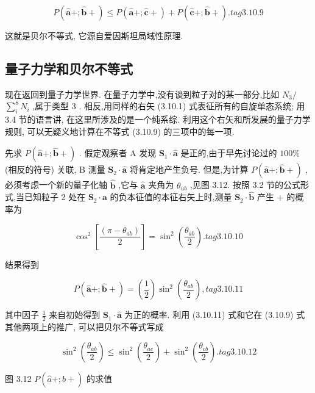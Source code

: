 $$
P\left( {\widehat{\mathbf{a}}+;\widehat{\mathbf{b}} + }\right) \leq P\left( {\widehat{\mathbf{a}}+;\widehat{\mathbf{c}} + }\right) + P\left( {\widehat{\mathbf{c}}+;\widehat{\mathbf{b}} + }\right) . tag{3.10.9}
$$

这就是贝尔不等式, 它源自爱因斯坦局域性原理.

\subsection{量子力学和贝尔不等式}

现在返回到量子力学世界. 在量子力学中,没有谈到粒子对的某一部分,比如 ${N}_{3}/$ $\mathop{\sum }\limits_{i}^{8}{N}_{i}$ ,属于类型 3 . 相反,用同样的右矢 (3.10.1) 式表征所有的自旋单态系统; 用 3.4 节的语言讲, 在这里所涉及的是一个纯系综. 利用这个右矢和所发展的量子力学规则, 可以无疑义地计算在不等式 (3.10.9) 的三项中的每一项.

先求 $P\left( {\widehat{\mathbf{a}}+;\widehat{\mathbf{b}} + }\right)$ . 假定观察者 $\mathrm{A}$ 发现 ${\mathbf{S}}_{1} \cdot \widehat{\mathbf{a}}$ 是正的,由于早先讨论过的 ${100}\%$ (相反的符号) 关联, $\mathrm{B}$ 测量 ${\mathbf{S}}_{2} \cdot \widehat{\mathbf{a}}$ 将肯定地产生负号. 但是,为计算 $P\left( {\widehat{\mathbf{a}}+;\widehat{\mathbf{b}} + }\right)$ ,必须考虑一个新的量子化轴 $\widehat{\mathbf{b}}$ ,它与 $\widehat{\mathbf{a}}$ 夹角为 ${\theta }_{ub}$ ,见图 3.12. 按照 3.2 节的公式形式,当已知粒子 2 处在 ${\mathbf{S}}_{2} \cdot \widehat{\mathbf{a}}$ 的负本征值的本征右矢上时,测量 ${\mathbf{S}}_{2} \cdot \widehat{\mathbf{b}}$ 产生 + 的概率为

$$
{\cos }^{2}\left\lbrack \frac{\left( \pi - {\theta }_{ab}\right) }{2}\right\rbrack = {\sin }^{2}\left( \frac{{\theta }_{ab}}{2}\right) . tag{3.10.10}
$$

结果得到

$$
P\left( {\widehat{\mathbf{a}}+;\widehat{\mathbf{b}} + }\right) = \left( \frac{1}{2}\right) {\sin }^{2}\left( \frac{{\theta }_{ab}}{2}\right) , tag{3.10.11}
$$

其中因子 $\frac{1}{2}$ 来自初始得到 ${\mathbf{S}}_{1} \cdot \widehat{\mathbf{a}}$ 为正的概率. 利用 (3.10.11) 式和它在 (3.10.9) 式其他两项上的推广, 可以把贝尔不等式写成

$$
{\sin }^{2}\left( \frac{{\theta }_{ab}}{2}\right) \leq {\sin }^{2}\left( \frac{{\theta }_{ac}}{2}\right) + {\sin }^{2}\left( \frac{{\theta }_{cb}}{2}\right) . tag{3.10.12}
$$



图 3.12 $P\left( {\widehat{a}+;\widehat{b} + }\right)$ 的求值

